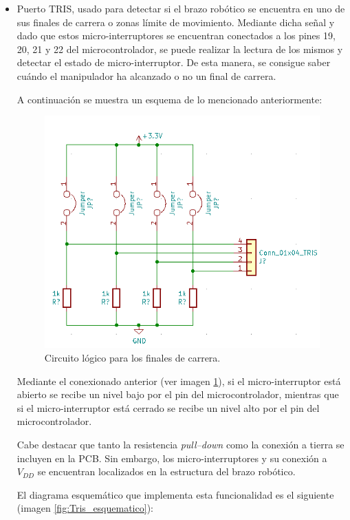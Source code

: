 \begin{itemize}
    \item Puerto TRIS, usado para detectar si el brazo robótico se encuentra en uno de sus finales de carrera o zonas límite de movimiento. Mediante dicha señal y dado que estos micro-interruptores se encuentran conectados a los pines 19, 20, 21 y 22 del microcontrolador, se puede realizar la lectura de los mismos y detectar el estado de micro-interruptor. De esta manera, se consigue saber cuándo el manipulador ha alcanzado o no un final de carrera.
    
    A continuación se muestra un esquema de lo mencionado anteriormente:
    
    \begin{figure}[H]
    \centering 
    \includegraphics[width=.64\linewidth]{pictures/MicroSwitchesSchematic.PNG}
    \caption{Circuito lógico para los finales de carrera.}
    \label{fig:Microinterruptores_esquematico}
    \end{figure}
    
    Mediante el conexionado anterior (ver imagen \ref{fig:Microinterruptores_esquematico}), si el micro-interruptor está abierto se recibe un nivel bajo por el pin del microcontrolador, mientras que si el micro-interruptor está cerrado se recibe un nivel alto por el pin del microcontrolador. 
    
    Cabe destacar que tanto la resistencia \textit{pull--down} como la conexión a tierra se incluyen en la \ac{PCB}. Sin embargo, los micro-interruptores y su conexión a $V_{DD}$ se encuentran localizados en la estructura del brazo robótico. 
    
    El diagrama esquemático que implementa esta funcionalidad es el siguiente (imagen \ref{fig:Tris_esquematico}):
    

\end{itemize}

